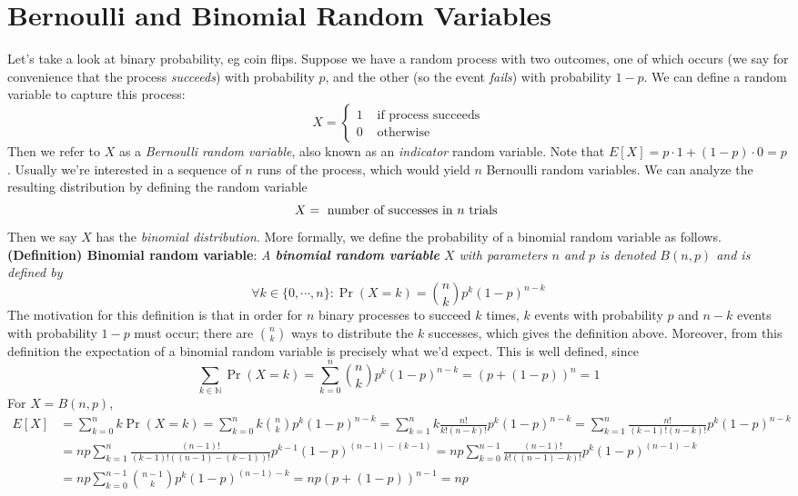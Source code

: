 \documentclass{article}
\newcommand*{\tb}{\textbf}
\newcommand*{\ti}{\textit}
\newcommand*{\nn}{\newline \newline}
\newcommand*{\N}{\mathbb{N}}
\begin{document}
\section{Bernoulli and Binomial Random Variables}
Let's take a look at binary probability, eg coin flips. Suppose we have a random process with two outcomes, one of which occurs (we say for convenience that the process \ti{succeeds}) with probability $ p $, and the other (so the event \ti{fails}) with probability $ 1 - p $. We can define a random variable to capture this process:
$$ X = \begin{cases}
    1 &\text{ if process succeeds} \\
    0 &\text{ otherwise }
\end{cases} $$
Then we refer to $ X $ as a \ti{Bernoulli random variable}, also known as an \ti{indicator} random variable. Note that $ E[X] = p \cdot 1 + (1 - p) \cdot 0 = p $. Usually we're interested in a sequence of $ n $ runs of the process, which would yield $ n $ Bernoulli random variables. We can analyze the resulting distribution by defining the random variable
$$ X = \text{ number of successes in $ n $ trials } $$
Then we say $ X $ has the \ti{binomial distribution}. More formally, we define the probability of a binomial random variable as follows.
\nn
\tb{(Definition) Binomial random variable}: \ti{A \tb{binomial random variable} $ X $ with parameters $ n $ and $ p $ is denoted $ B(n, p) $ and is defined by}
$$ \forall k \in \{ 0, \cdots, n \}: \Pr(X = k) = {n \choose k} p^k (1 - p)^{n - k} $$
The motivation for this definition is that in order for $ n $ binary processes to succeed $ k $ times, $ k $ events with probability $ p $ and $ n - k $ events with probability $ 1 - p $ must occur; there are $ {n \choose k} $ ways to distribute the $ k $ successes, which gives the definition above. Moreover, from this definition the expectation of a binomial random variable is precisely what we'd expect. This is well defined, since
$$ \sum_{k \in \N} \Pr(X = k) = \sum_{k = 0}^n {n \choose k} p^k (1 - p)^{n - k} = (p + (1 - p))^n = 1 $$
For $ X = B(n, p) $,
$$ \begin{aligned}
    E[X] &= \sum_{k = 0}^n k \Pr(X = k) = \sum_{k = 0}^n k {n \choose k} p^k (1 - p)^{n - k} = \sum_{k = 1}^n k \frac{n!}{k! (n - k)!} p^k (1 - p)^{n - k} = \sum_{k = 1}^n \frac{n!}{(k - 1)! (n - k)!} p^k (1 - p)^{n - k} \\
    &= n p \sum_{k = 1}^n \frac{(n - 1)!}{(k - 1)! ((n - 1) - (k - 1))!} p^{k - 1} (1 - p)^{(n - 1) - (k - 1)} = n p \sum_{k = 0}^{n - 1} \frac{(n - 1)!}{k! ((n - 1) - k)!} p^k (1 - p)^{(n - 1) - k} \\
    &= n p \sum_{k = 0}^{n - 1} {{n - 1} \choose k} p^k (1 - p)^{(n - 1) - k} = n p (p + (1 - p))^{n - 1} = n p
\end{aligned} $$
\end{document}
